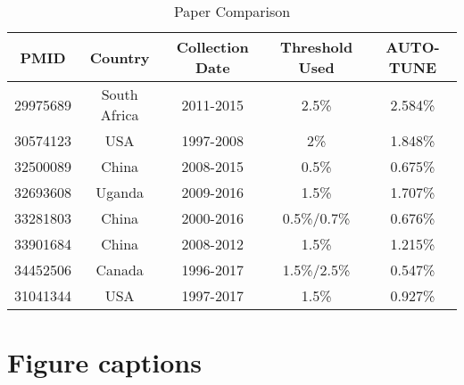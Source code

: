 \documentclass[utf8]{FrontiersinHarvard} %
\begin{document}
\begin{table}[h]
\caption{Paper Comparison}
\vspace{10pt}
\centering
\label{tab:paperComparison}
\begin{tabular}{|c|c|c|c|c|}
\hline
PMID & Country & Collection Date & Threshold Used & AUTO-TUNE \\
\hline
29975689 & South Africa & 2011-2015 & 2.5\% & 2.584\% \\
30574123 & USA & 1997-2008 & 2\% & 1.848\% \\
32500089 & China & 2008-2015 & 0.5\% & 0.675\% \\
32693608 & Uganda & 2009-2016 & 1.5\% & 1.707\% \\
33281803 & China & 2000-2016 & 0.5\%/0.7\% & 0.676\% \\
33901684 & China & 2008-2012 & 1.5\% & 1.215\% \\
34452506 & Canada & 1996-2017 & 1.5\%/2.5\% & 0.547\% \\
31041344 & USA & 1997-2017 & 1.5\% & 0.927\% \\
\hline
\end{tabular}
\end{table}

\section*{Figure captions}
\end{document}
